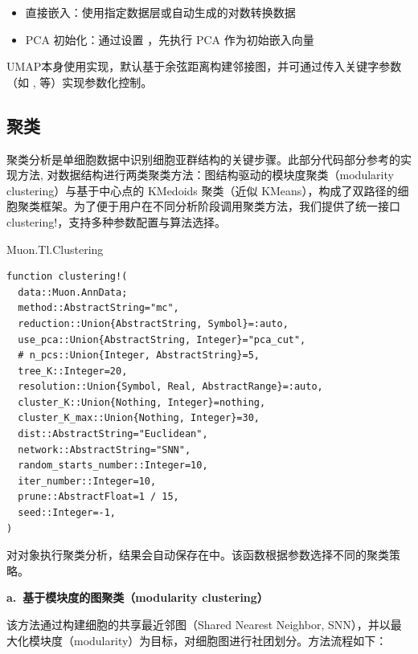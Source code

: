 \begin{itemize}
  \item 直接嵌入：使用指定数据层或自动生成的对数转换数据
  \item PCA 初始化：通过设置 ，先执行 PCA 作为初始嵌入向量
\end{itemize}

UMAP本身使用实现，默认基于余弦距离构建邻接图，并可通过传入关键字参数（如 ,  等）实现参数化控制。

\subsection{聚类}

聚类分析是单细胞数据中识别细胞亚群结构的关键步骤。此部分代码部分参考的实现方法, 对数据结构进行两类聚类方法：图结构驱动的模块度聚类（modularity clustering）与基于中心点的 KMedoids 聚类（近似 KMeans），构成了双路径的细胞聚类框架。为了便于用户在不同分析阶段调用聚类方法，我们提供了统一接口 clustering!，支持多种参数配置与算法选择。

\begin{fancybox}{Muon.Tl.Clustering}
  \begin{lstlisting}
function clustering!(
  data::Muon.AnnData;
  method::AbstractString="mc",
  reduction::Union{AbstractString, Symbol}=:auto,
  use_pca::Union{AbstractString, Integer}="pca_cut",
  # n_pcs::Union{Integer, AbstractString}=5,
  tree_K::Integer=20,
  resolution::Union{Symbol, Real, AbstractRange}=:auto,
  cluster_K::Union{Nothing, Integer}=nothing,
  cluster_K_max::Union{Nothing, Integer}=30,
  dist::AbstractString="Euclidean",
  network::AbstractString="SNN",
  random_starts_number::Integer=10,
  iter_number::Integer=10,
  prune::AbstractFloat=1 / 15,
  seed::Integer=-1,
)
  \end{lstlisting}
\end{fancybox}

对对象执行聚类分析，结果会自动保存在中。该函数根据参数选择不同的聚类策略。

\textbf{a.~基于模块度的图聚类（modularity clustering）}

该方法通过构建细胞的共享最近邻图（Shared Nearest Neighbor, SNN），并以最大化模块度（modularity）为目标，对细胞图进行社团划分。方法流程如下：

